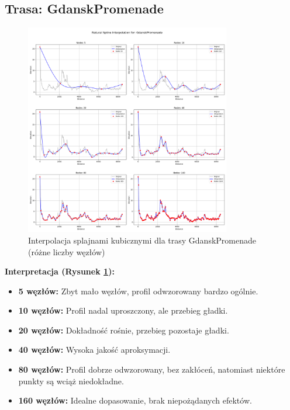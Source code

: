 \documentclass[11pt,a4paper]{article}
\begin{document}
\subsection{Trasa: GdanskPromenade}
\begin{figure}[H]
    \centering
    \includegraphics[width=0.8\textwidth]{../plots/GdanskPromenade_Spline_basic.png}
    \caption{Interpolacja splajnami kubicznymi dla trasy GdanskPromenade (różne liczby węzłów)}
    \label{fig:promenade_splajny}
\end{figure}
\textbf{Interpretacja (Rysunek \ref{fig:promenade_splajny}):} 
\begin{itemize}
    \item \textbf{5 węzłów:} Zbyt mało węzłów, profil odwzorowany bardzo ogólnie.
    \item \textbf{10 węzłów:} Profil nadal uproszczony, ale przebieg gładki.
    \item \textbf{20 węzłów:} Dokładność rośnie, przebieg pozostaje gładki.
    \item \textbf{40 węzłów:} Wysoka jakość aproksymacji.
    \item \textbf{80 węzłów:} Profil dobrze odwzorowany, bez zakłóceń, natomiast niektóre punkty są wciąż niedokładne.
    \item \textbf{160 węzłów:} Idealne dopasowanie, brak niepożądanych efektów.
\end{itemize}
\end{document}

